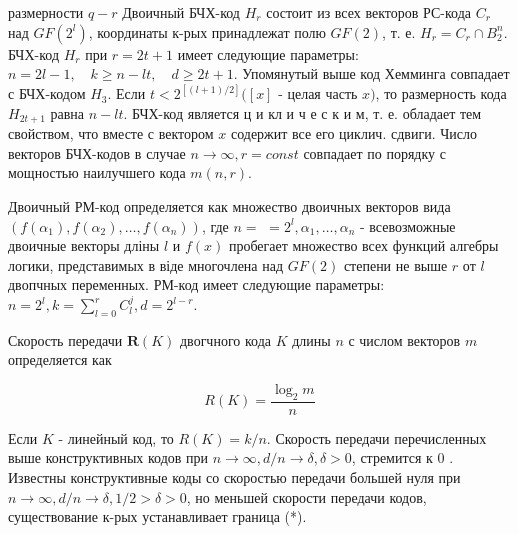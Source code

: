 \documentclass[10pt]{article}
\begin{document}
размерности $q-r$ Двоичный БЧХ-код $H_{r}$ состоит из всех векторов РС-кода $C_{r}$ над $G F\left(2^{l}\right)$, координаты к-рых принадлежат полю $G F(2)$, т. е. $H_{r}=C_{r} \cap B_{2}^{n}$. БЧХ-код $H_{r}$ при $r=2 t+1$ имеет следующие параметры: $n=2 l-1, \quad k \geqslant n-l t, \quad d \geqslant 2 t+1$. Упомянутый выше код Хемминга совпадает с БЧХ-кодом $H_{3}$. Если $t<2^{[(l+1) / 2]}([x]$ - целая часть $x)$, то размерность кода $H_{2 t+1}$ равна $n-l t$. БЧХ-код является ц и кл и ч е с к и м, т. е. обладает тем свойством, что вместе с вектором $x$ содержит все его циклич. сдвиги. Число векторов БЧХ-кодов в случае $n \rightarrow \infty, r=c o n s t$ совпадает по порядку с мощностью наилучшего кода $m(n, r)$.



Двоичный РМ-код определяется как множество двоичных векторов вида $\left(f\left(\alpha_{1}\right), f\left(\alpha_{2}\right), \ldots, f\left(\alpha_{n}\right)\right)$, где $n=$ $=2^{l}, \alpha_{1}, \ldots, \alpha_{n}$ - всевозможные двоичные векторы дліны $l$ и $f(x)$ пробегает множество всех функций алгебры логики, представимых в віде многочлена над $G F(2)$ степени не выше $r$ от $l$ двопчных переменных. РМ-код имеет следующие параметры: $n=2^{l}, k=\sum_{l=0}^{r} C_{l}^{j}, d=2^{l-r}$.



Скорость передачи $\boldsymbol{R}(K)$ двогчного кода $K$ длины $n$ с числом векторов $m$ определяется как



\[

R(K)=\frac{\log _{2} m}{n}

\]



Если $K$ - линейный код, то $R(K)=k / n$. Скорость передачи перечисленных выше конструктивных кодов при $n \rightarrow \infty, d / n \rightarrow \delta, \delta>0$, стремится к 0 . Известны конструктивные коды со скоростью передачи большей нуля при $n \rightarrow \infty, d / n \rightarrow \delta, 1 / 2>\delta>0$, но меньшей скорости передачи кодов, существование к-рых устанавливает граница (*).
\end{document}
